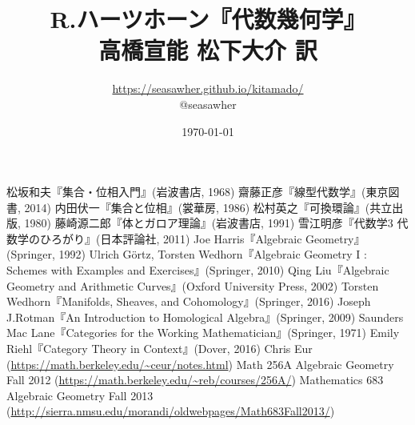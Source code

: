 \documentclass[12pt]{jsarticle}%
\begin{document}
\title{R.ハーツホーン『代数幾何学』\\高橋宣能 松下大介 訳}
\author{\url{https://seasawher.github.io/kitamado/} \\ @seasawher}
\date{\today}
\maketitle




\newpage



\newpage



\newpage



\newpage



\newpage



\newpage



\newpage






\begin{thebibliography}{1}%
   松坂和夫『集合・位相入門』(岩波書店, 1968)
   齋藤正彦『線型代数学』(東京図書, 2014)
   内田伏一『集合と位相』(裳華房, 1986)
   松村英之『可換環論』(共立出版, 1980)
   藤崎源二郎『体とガロア理論』(岩波書店, 1991)
   雪江明彦『代数学3 代数学のひろがり』(日本評論社, 2011)
   Joe Harris『Algebraic Geometry』(Springer, 1992)
   Ulrich G\"{o}rtz, Torsten Wedhorn『Algebraic Geometry I : Schemes  with Examples and Exercises』(Springer, 2010)
   Qing Liu『Algebraic Geometry and Arithmetic Curves』(Oxford University Press, 2002)
   Torsten Wedhorn『Manifolds, Sheaves, and Cohomology』(Springer, 2016)
   Joseph J.Rotman『An Introduction to Homological Algebra』(Springer, 2009)
   Saunders Mac Lane『Categories for the Working Mathematician』(Springer, 1971)
   Emily Riehl『Category Theory in Context』(Dover, 2016)
   Chris Eur (\url{https://math.berkeley.edu/~ceur/notes.html})
   Math 256A Algebraic Geometry Fall 2012 (\url{https://math.berkeley.edu/~reb/courses/256A/})
   Mathematics 683 Algebraic Geometry Fall 2013 (\url{http://sierra.nmsu.edu/morandi/oldwebpages/Math683Fall2013/})
\end{thebibliography}
\end{document}
